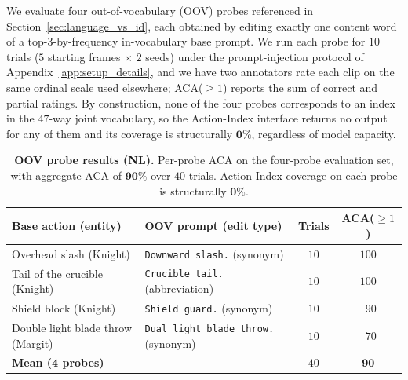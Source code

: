 We evaluate four out-of-vocabulary (OOV) probes referenced in Section~\ref{sec:language_vs_id}, each obtained by editing exactly one content word of a top-$3$-by-frequency in-vocabulary base prompt. We run each probe for $10$ trials ($5$ starting frames $\times$ $2$ seeds) under the prompt-injection protocol of Appendix~\ref{app:setup_details}, and we have two annotators rate each clip on the same ordinal scale used elsewhere; ACA($\geq 1$) reports the sum of correct and partial ratings. By construction, none of the four probes corresponds to an index in the $47$-way joint vocabulary, so the Action-Index interface returns no output for any of them and its coverage is structurally $\mathbf{0}\%$, regardless of model capacity.

\begin{table}[h]
  \caption{\textbf{OOV probe results (NL).} Per-probe ACA on the four-probe evaluation set, with aggregate ACA of $\mathbf{90}\%$ over $40$ trials. Action-Index coverage on each probe is structurally $\mathbf{0}\%$.}
  \label{tab:oov_probes}
  \centering
  \setlength{\tabcolsep}{4pt}
  \begin{tabular}{llcc}
    \toprule
    Base action (entity)                & OOV prompt (edit type)                       & Trials & ACA($\geq 1$) \\
    \midrule
    Overhead slash (Knight)             & \texttt{Downward slash.} (synonym)           & $10$   & $100$            \\
    Tail of the crucible (Knight)       & \texttt{Crucible tail.} (abbreviation)       & $10$   & $100$            \\
    Shield block (Knight)               & \texttt{Shield guard.} (synonym)             & $10$   & $\phantom{0}90$  \\
    Double light blade throw (Margit)   & \texttt{Dual light blade throw.} (synonym)   & $10$   & $\phantom{0}70$  \\
    \midrule
    \textbf{Mean ($\mathbf{4}$ probes)} &                                              & $40$   & $\mathbf{90}$    \\
    \bottomrule
  \end{tabular}
\end{table}


